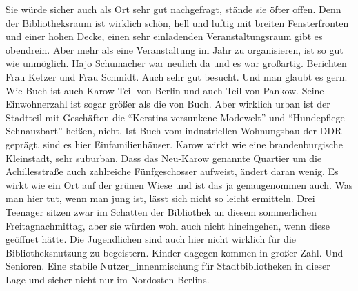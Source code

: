 \documentclass[a4paper,
fontsize=11pt,
oneside,
numbers=noperiodatend,
parskip=half-,
bibliography=totoc,
final
]{scrartcl}
\begin{document}
Sie würde sicher auch als Ort sehr gut nachgefragt, stände sie öfter
offen. Denn der Bibliotheksraum ist wirklich schön, hell und luftig mit
breiten Fensterfronten und einer hohen Decke, einen sehr einladenden
Veranstaltungsraum gibt es obendrein. Aber mehr als eine Veranstaltung
im Jahr zu organisieren, ist so gut wie unmöglich. Hajo Schumacher war
neulich da und es war großartig. Berichten Frau Ketzer und Frau Schmidt.
Auch sehr gut besucht. Und man glaubt es gern. Wie Buch ist auch Karow
Teil von Berlin und auch Teil von Pankow. Seine Einwohnerzahl ist sogar
größer als die von Buch. Aber wirklich urban ist der Stadtteil mit
Geschäften die \enquote{Kerstins versunkene Modewelt} und
\enquote{Hundepflege Schnauzbart} heißen, nicht. Ist Buch vom
industriellen Wohnungsbau der DDR geprägt, sind es hier
Einfamilienhäuser. Karow wirkt wie eine brandenburgische Kleinstadt,
sehr suburban. Dass das Neu-Karow genannte Quartier um die
Achillesstraße auch zahlreiche Fünfgeschosser aufweist, ändert daran
wenig. Es wirkt wie ein Ort auf der grünen Wiese und ist das ja
genaugenommen auch. Was man hier tut, wenn man jung ist, lässt sich
nicht so leicht ermitteln. Drei Teenager sitzen zwar im Schatten der
Bibliothek an diesem sommerlichen Freitagnachmittag, aber sie würden
wohl auch nicht hineingehen, wenn diese geöffnet hätte. Die Jugendlichen
sind auch hier nicht wirklich für die Bibliotheksnutzung zu begeistern.
Kinder dagegen kommen in großer Zahl. Und Senioren. Eine stabile
Nutzer\_innenmischung für Stadtbibliotheken in dieser Lage und sicher
nicht nur im Nordosten Berlins.
\end{document}
